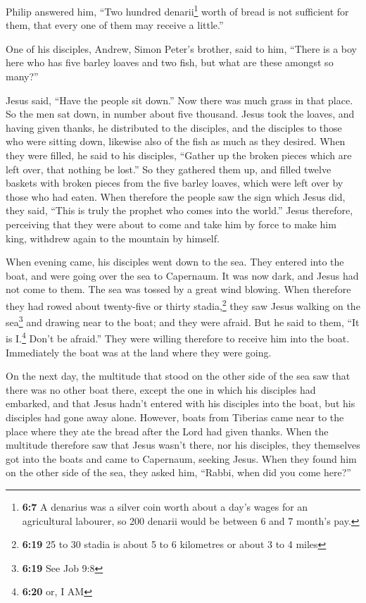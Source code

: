  Philip answered him, ``Two hundred denarii\footnote{\textbf{6:7}
  A denarius was a silver coin worth about a day's wages for an
  agricultural labourer, so 200 denarii would be between 6 and 7 month's
  pay.} worth of bread is not sufficient for them, that every one of
them may receive a little.''

 One of his disciples, Andrew, Simon Peter's brother, said
to him,  ``There is a boy here who has five barley loaves
and two fish, but what are these amongst so many?''

 Jesus said, ``Have the people sit down.'' Now there was
much grass in that place. So the men sat down, in number about five
thousand.  Jesus took the loaves, and having given
thanks, he distributed to the disciples, and the disciples to those who
were sitting down, likewise also of the fish as much as they desired.
 When they were filled, he said to his disciples,
``Gather up the broken pieces which are left over, that nothing be
lost.''  So they gathered them up, and filled twelve
baskets with broken pieces from the five barley loaves, which were left
over by those who had eaten.  When therefore the people
saw the sign which Jesus did, they said, ``This is truly the prophet who
comes into the world.''  Jesus therefore, perceiving that
they were about to come and take him by force to make him king, withdrew
again to the mountain by himself.

 When evening came, his disciples went down to the sea.
 They entered into the boat, and were going over the sea
to Capernaum. It was now dark, and Jesus had not come to them.
 The sea was tossed by a great wind blowing.
 When therefore they had rowed about twenty-five or
thirty stadia,\footnote{\textbf{6:19} 25 to 30 stadia is about 5 to 6
  kilometres or about 3 to 4 miles} they saw Jesus walking on the
sea\footnote{\textbf{6:19} See Job 9:8} and drawing near to the boat;
and they were afraid.  But he said to them, ``It is
I.\footnote{\textbf{6:20} or, I AM} Don't be afraid.'' 
They were willing therefore to receive him into the boat. Immediately
the boat was at the land where they were going.

 On the next day, the multitude that stood on the other
side of the sea saw that there was no other boat there, except the one
in which his disciples had embarked, and that Jesus hadn't entered with
his disciples into the boat, but his disciples had gone away alone.
 However, boats from Tiberias came near to the place
where they ate the bread after the Lord had given thanks.
 When the multitude therefore saw that Jesus wasn't
there, nor his disciples, they themselves got into the boats and came to
Capernaum, seeking Jesus.  When they found him on the
other side of the sea, they asked him, ``Rabbi, when did you come
here?''

